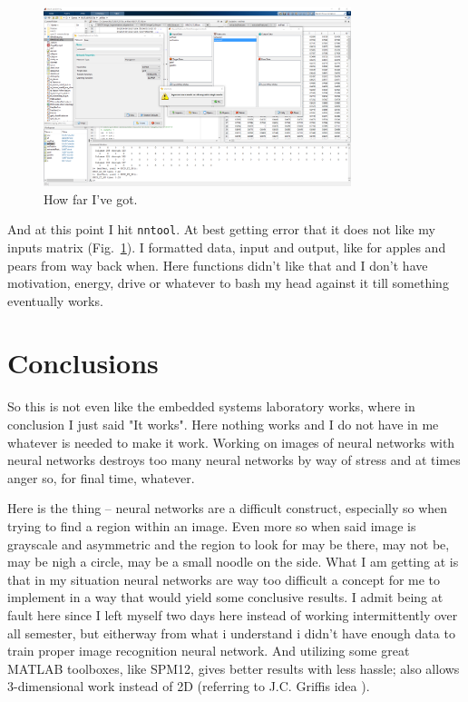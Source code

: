 \documentclass[12pt]{article}
\begin{document}
\begin{figure}[!htb]
\centering
\includegraphics[width=0.8\textwidth]{img/MATLAB_2017-12-17_13-42-07}
\caption{How far I've got.}
\label{fig:fuckItImOut}
\end{figure}

And at this point I hit \texttt{nntool}. At best getting error that it does not like my inputs matrix (Fig.~\ref{fig:fuckItImOut}). I formatted data, input and output, like for apples and pears from way back when. Here functions didn't like that and I don't have motivation, energy, drive or whatever to bash my head against it till something eventually works.

\section{Conclusions}
\label{sec:conclusions}

So this is not even like the embedded systems laboratory works, where in conclusion I just said "It works". Here nothing works and I do not have in me whatever is needed to make it work. Working on images of neural networks with neural networks destroys too many neural networks by way of stress and at times anger so, for final time, whatever.

Here is the thing – neural networks are a difficult construct, especially so when trying to find a region within an image. Even more so when said image is grayscale and asymmetric and the region to look for may be there, may not be, may be nigh a circle, may be a small noodle on the side. What I am getting at is that in my situation neural networks are way too difficult a concept for me to implement in a way that would yield some conclusive results. I admit being at fault here since I left myself two days here instead of working intermittently over all semester, but eitherway from what i understand i didn't have enough data to train proper image recognition neural network. And utilizing some great MATLAB toolboxes, like SPM12, gives better results with less hassle; also allows 3-dimensional work instead of 2D (referring to J.C. Griffis idea \cite{griffis2016voxel}).


\clearpage

\clearpage
\nocite{*}


\end{document}
